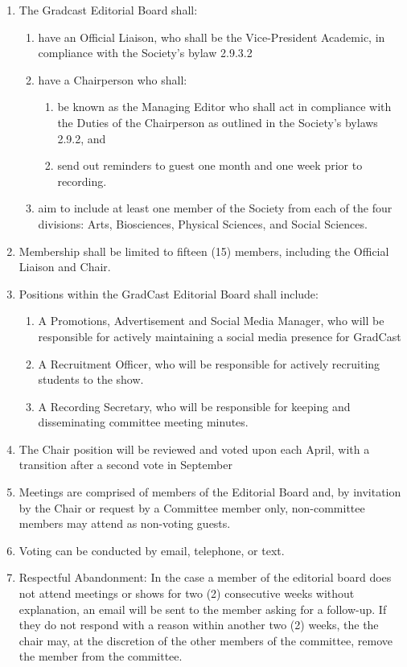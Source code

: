\begin{enumerate} [label*=\arabic*., align=left]	
\item The Gradcast Editorial Board shall: 
\begin{enumerate}
\item have an Official Liaison, who shall be the Vice-President Academic, in compliance with the Society's bylaw 2.9.3.2 
\item have a Chairperson who shall:
\begin{enumerate}
\item be known as the Managing Editor who shall act in compliance with the Duties of the Chairperson as outlined in the Society's bylaws 2.9.2, and 
\item send out reminders to guest one month and one week prior to recording.
\end{enumerate}

\item  aim to include at least one member of the Society from each of the four divisions: Arts, Biosciences, Physical Sciences, and Social Sciences.
\end{enumerate}

\item Membership shall be limited to fifteen (15) members, including the Official Liaison and Chair.
\item Positions within the GradCast Editorial Board shall include:
\begin{enumerate}
\item A Promotions, Advertisement and Social Media Manager, who will be responsible
for actively maintaining a social media presence for GradCast
\item A Recruitment Officer, who will be responsible for actively recruiting students to the
show.
\item A Recording Secretary, who will be responsible for keeping and disseminating
committee meeting minutes.
\end{enumerate}
\item The Chair position will be reviewed and voted upon each April, with a transition after a second vote in September
\item Meetings are comprised of members of the Editorial Board and, by invitation by the Chair or request by a Committee member only, non-committee members may attend as non-voting guests.
\item Voting can be conducted by email, telephone, or text.
\item Respectful Abandonment: In the case a member of the editorial board does not attend meetings
or shows for two (2) consecutive weeks without explanation, an email will be sent to the member asking for a follow-up. If they do not respond with a reason within another two (2) weeks, the the chair may, at the discretion of the other members of the committee, remove the member from the committee.
\end{enumerate}


